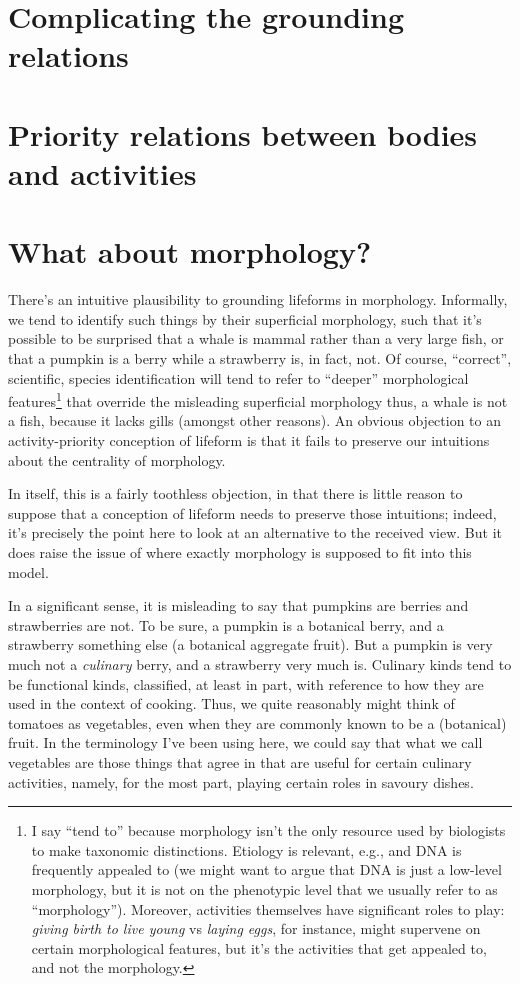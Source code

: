 \documentclass{article}
\newcommand{\dash}{\unskip{—}}
\begin{document}
\section{Complicating the grounding relations}\label{sec:Complicating}

\section{Priority relations between bodies and activities}\label{sec:ObjPriority}

\section{What about morphology?}\label{sec:ObjMorphology}

There's an intuitive plausibility to grounding lifeforms in morphology. Informally, we tend to identify such things by their superficial morphology, such that it's possible to be surprised that a whale is mammal rather than a very large fish, or that a pumpkin is a berry while a strawberry is, in fact, not. Of course, \enquote{correct}, scientific, species identification will tend to refer to \enquote{deeper} morphological features\footnote{I say \enquote{tend to} because morphology isn't the only resource used by biologists to make taxonomic distinctions. Etiology is relevant, e.g., and DNA is frequently appealed to (we might want to argue that DNA is just a low-level morphology, but it is not on the phenotypic level that we usually refer to as \enquote{morphology}). Moreover, activities themselves have significant roles to play: \emph{giving birth to live young} vs \emph{laying eggs}, for instance, might supervene on certain morphological features, but it's the activities that get appealed to, and not the morphology.} that override the misleading superficial morphology \dash thus, a whale is not a fish, because it lacks gills (amongst other reasons). An obvious objection to an activity-priority conception of lifeform is that it fails to preserve our intuitions about the centrality of morphology.

In itself, this is a fairly toothless objection, in that there is little reason to suppose that a conception of lifeform needs to preserve those intuitions; indeed, it's precisely the point here to look at an alternative to the received view. But it does raise the issue of where exactly morphology is supposed to fit into this model.

In a significant sense, it is misleading to say that pumpkins are berries and strawberries are not. To be sure, a pumpkin is a botanical berry, and a strawberry something else (a botanical aggregate fruit). But a pumpkin is very much not a \emph{culinary} berry, and a strawberry very much is. Culinary kinds tend to be functional kinds, classified, at least in part, with reference to how they are used in the context of cooking. Thus, we quite reasonably might think of tomatoes  as vegetables, even when they are commonly known to be a (botanical) fruit. In the terminology I've been using here, we could say that what we call vegetables are those things that agree in \dash that are useful for \dash certain culinary activities, namely, for the most part, playing certain roles in savoury dishes.
\end{document}
